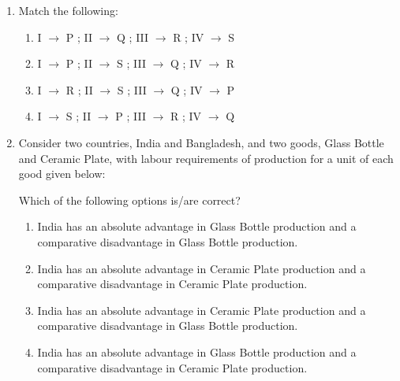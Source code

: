 \documentclass[12pt]{article}
\theoremstyle{remark}
\begin{document}
\begin{enumerate}
\begin{enumerate}
\begin{multicols}{2}
\end{multicols} \end{enumerate}
\hfill{}
\item 
Match the following: 
\vspace{0.2cm}
\begin{centering}
\begin{table}[H]

\caption{}
\label{Table 1.2}
\end{table}
\end{centering}
\begin{enumerate} 
\item   I $\rightarrow$ P ; II $\rightarrow$ Q ; III $\rightarrow$ R ; IV $\rightarrow$ S 
\item   I $\rightarrow$ P ; II $\rightarrow$ S ; III $\rightarrow$ Q ; IV $\rightarrow$ R 
\item   I $\rightarrow$ R ; II $\rightarrow$ S ; III $\rightarrow$ Q ; IV $\rightarrow$ P 
\item   I $\rightarrow$ S ; II $\rightarrow$ P ; III $\rightarrow$ R ; IV $\rightarrow$ Q 
\end{enumerate}
\hfill{}
\item Consider two countries, India and Bangladesh, and two goods, Glass Bottle and Ceramic Plate, with labour requirements of production for a unit of each good given below:
\begin{centering}
\begin{table}[H]

\caption{}
\label{Table 1.3}
\end{table}
\end{centering}
Which of the following options is/are correct? \\
\begin{enumerate}
\item   India has an absolute advantage in Glass Bottle production and a comparative disadvantage in Glass Bottle production. 
\item   India has an absolute advantage in Ceramic Plate production and a comparative disadvantage in Ceramic Plate production.
\item   India has an absolute advantage in Ceramic Plate production and a comparative disadvantage in Glass Bottle production. 
\item   India has an absolute advantage in Glass Bottle production and a comparative disadvantage in Ceramic Plate production.
\end{enumerate}
\hfill{}

\end{enumerate}
\end{document}
